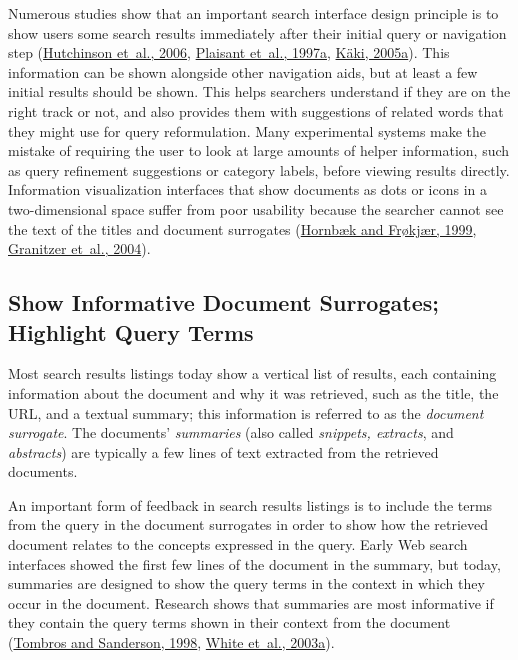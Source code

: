 \documentclass[sigconf,nonacm,screen,pbalance]{acmart}
\begin{document}
Numerous studies show that an important search interface design principle is to show users some search
results immediately after their initial query or navigation step (\href{https://searchuserinterfaces.com/book/sui_references.html#hutchinson2006eic}{Hutchinson et~al., 2006},
\href{https://searchuserinterfaces.com/book/sui_references.html#plaisant1997bts}{ Plaisant et~al., 1997a},
\href{https://searchuserinterfaces.com/book/sui_references.html#kakidissertation}{ Käki, 2005a}).
This information can be shown alongside other navigation aids, but at least a few initial
results should be shown. This helps searchers understand if they are on the right track or not, and also
provides them with suggestions of related words that they might use for query reformulation. Many
experimental systems make the mistake of requiring the user to look at large amounts of helper
information, such as query refinement suggestions or category labels, before viewing results directly.
Information visualization interfaces that show documents as dots or icons in a two-dimensional space
suffer from poor usability because the searcher cannot see the text of the titles and document
surrogates (\href{https://searchuserinterfaces.com/book/sui_references.html#hornbaek1999tmi}{Hornbæk and Frøkjær, 1999}, \href{https://searchuserinterfaces.com/book/sui_references.html#granitzer2004esi}{ Granitzer et~al., 2004}).

\subsection{Show Informative Document Surrogates; Highlight Query Terms}

Most search results listings today show a vertical list of results, each containing information about
the document and why it was retrieved, such as the title, the URL, and a textual summary; this
information is referred to as the {\em  document surrogate}. The documents' {\em  summaries} (also
called {\em  snippets, extracts}, and {\em  abstracts}) are typically a few lines of text extracted
from the retrieved documents.

An important form of feedback in search results listings is to include the terms from the query in the
document surrogates in order to show how the retrieved document relates to the concepts expressed in the
query. Early Web search interfaces showed the first few lines of the document in the summary, but today,
summaries are designed to show the query terms in the context in which they occur in the document.
Research shows that summaries are most informative if they contain the query terms shown in their
context from the document (\href{https://searchuserinterfaces.com/book/sui_references.html#tombros1998aqb}{Tombros and Sanderson, 1998}, \href{https://searchuserinterfaces.com/book/sui_references.html#white2003tos}{ White et~al., 2003a}).
\end{document}
